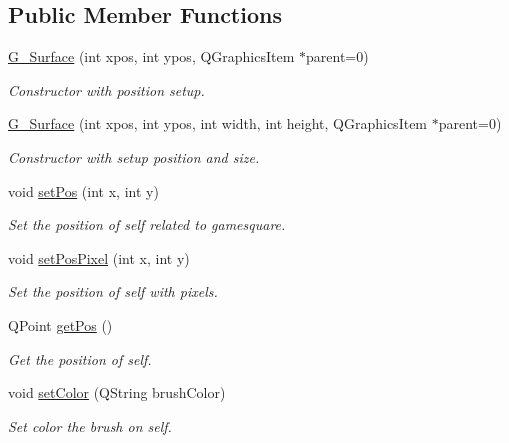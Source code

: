 \subsection*{Public Member Functions}
\begin{DoxyCompactItemize}
\item 
\hyperlink{class_g___surface_afb71c0c8f19e917e3de6b1547ee7ec0b}{G\+\_\+\+Surface} (int xpos, int ypos, Q\+Graphics\+Item $\ast$parent=0)
\begin{DoxyCompactList}\small\item\em Constructor with position setup. \end{DoxyCompactList}\item 
\hyperlink{class_g___surface_ae7d55b80e9b5f1ac565fca487900993c}{G\+\_\+\+Surface} (int xpos, int ypos, int width, int height, Q\+Graphics\+Item $\ast$parent=0)
\begin{DoxyCompactList}\small\item\em Constructor with setup position and size. \end{DoxyCompactList}\item 
void \hyperlink{class_g___surface_adacf1e913c711bb57d8145991f41fb5a}{set\+Pos} (int x, int y)
\begin{DoxyCompactList}\small\item\em Set the position of self related to gamesquare. \end{DoxyCompactList}\item 
void \hyperlink{class_g___surface_a6938d1689fbdf07e428d611766b6f331}{set\+Pos\+Pixel} (int x, int y)
\begin{DoxyCompactList}\small\item\em Set the position of self with pixels. \end{DoxyCompactList}\item 
Q\+Point \hyperlink{class_g___surface_a1aae4cce58f1381631ac5735e10b85b5}{get\+Pos} ()
\begin{DoxyCompactList}\small\item\em Get the position of self. \end{DoxyCompactList}\item 
void \hyperlink{class_g___surface_a44703a4951f6948fa890be9b7374c71e}{set\+Color} (Q\+String brush\+Color)
\begin{DoxyCompactList}\small\item\em Set color the brush on self. \end{DoxyCompactList}\end{DoxyCompactItemize}


